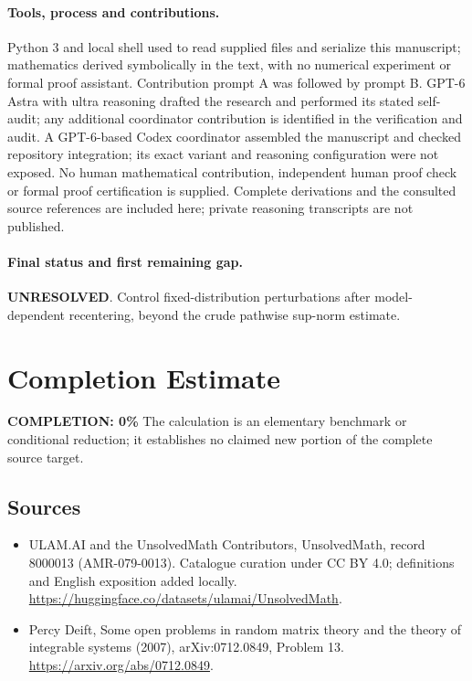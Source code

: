 \documentclass[11pt]{article}
\begin{document}
\paragraph{Tools, process and contributions.}
Python 3 and local shell used to read supplied files and serialize this manuscript; mathematics derived symbolically in the text, with no numerical experiment or formal proof assistant. Contribution prompt A was followed by prompt B. GPT-6 Astra with ultra reasoning drafted the research and performed its stated self-audit; any additional coordinator contribution is identified in the verification and audit. A GPT-6-based Codex coordinator assembled the manuscript and checked repository integration; its exact variant and reasoning configuration were not exposed. No human mathematical contribution, independent human proof check or formal proof certification is supplied. Complete derivations and the consulted source references are included here; private reasoning transcripts are not published.

\paragraph{Final status and first remaining gap.}
\textbf{UNRESOLVED}. Control fixed-distribution perturbations after model-dependent recentering, beyond the crude pathwise sup-norm estimate.

\section{Completion Estimate}
\noindent\textbf{COMPLETION: 0\%}
The calculation is an elementary benchmark or conditional reduction; it establishes no claimed new portion of the complete source target.

\subsection{Sources}
\begin{itemize}
\item[\hypertarget{source:8000013:1}{S1}] ULAM.AI and the UnsolvedMath Contributors, UnsolvedMath, record 8000013 (AMR-079-0013). Catalogue curation under CC BY 4.0; definitions and English exposition added locally.
\url{https://huggingface.co/datasets/ulamai/UnsolvedMath}.
\item[\hypertarget{source:8000013:2}{S2}] Percy Deift, Some open problems in random matrix theory and the theory of integrable systems (2007), arXiv:0712.0849, Problem 13.
\url{https://arxiv.org/abs/0712.0849}.
\end{itemize}
\label{end:8000013}
\end{document}
